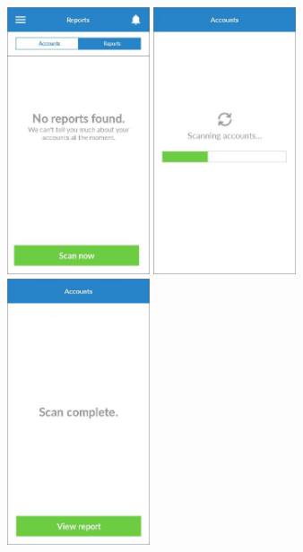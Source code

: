 \begin{figure}
  \subfigures
  \centering
  \begin{minipage}{4.6cm}
    \centering
    \includegraphics[width=4.2cm]{inc/ui_create_report_step1.jpg}
    \caption{}
    \label{fig:ui_create_report_step1}
  \end{minipage}
  \begin{minipage}{4.6cm}
    \centering
    \includegraphics[width=4.2cm]{inc/ui_create_report_step2.jpg}
    \caption{}
    \label{fig:ui_create_report_step2}
  \end{minipage}
  \begin{minipage}{4.6cm}
    \centering
    \includegraphics[width=4.2cm]{inc/ui_create_report_step3.jpg}
    \caption{}
    \label{fig:ui_create_report_step3}
  \end{minipage}
\end{figure}

